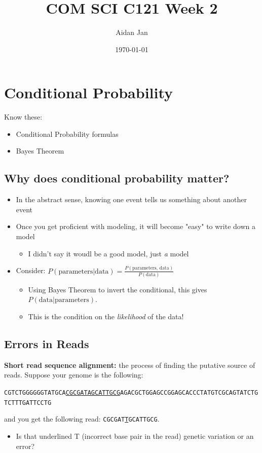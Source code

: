 \documentclass[10pt]{article}
\title{COM SCI C121 Week 2}
\author{Aidan Jan}
\date{\today}
\begin{document}
\maketitle
\section*{Conditional Probability}
Know these:
\begin{itemize}
    \item Conditional Probability formulas
    \item Bayes Theorem
\end{itemize}

\subsection*{Why does conditional probability matter?}
\begin{itemize}
    \item In the abstract sense, knowing one event tells us something about another event
    \item Once you get proficient with modeling, it will become "easy" to write down a model
    \begin{itemize}
        \item I didn't say it woudl be a good model, just \textit{a} model
    \end{itemize}
    \item Consider: $P(\text{parameters}\vert \text{data}) = \frac{P(\text{parameters, data})}{P(\text{data})}$
    \begin{itemize}
        \item Using Bayes Theorem to invert the conditional, this gives $P(\text{data} \vert \text{parameters})$.  
        \item This is the condition on the \textit{likelihood} of the data!
    \end{itemize}
\end{itemize}

\subsection*{Errors in Reads}
\textbf{Short read sequence alignment:} the process of finding the putative source of reads.
Suppose your genome is the following:
\begin{center}
\texttt{CGTCTGGGGGGTATGCA\underline{CGCGATAGCATTGCG}AGACGCTGGAGCCGGAGCACCCTATGTCGCAGTATCTGTCTTTGATTCCTG}
\end{center}
and you get the following read: \texttt{CGCGAT\underline{T}GCATTGCG}.  
\begin{itemize}
    \item Is that underlined T (incorrect base pair in the read) genetic variation or an error?
\end{itemize}
\end{document}
